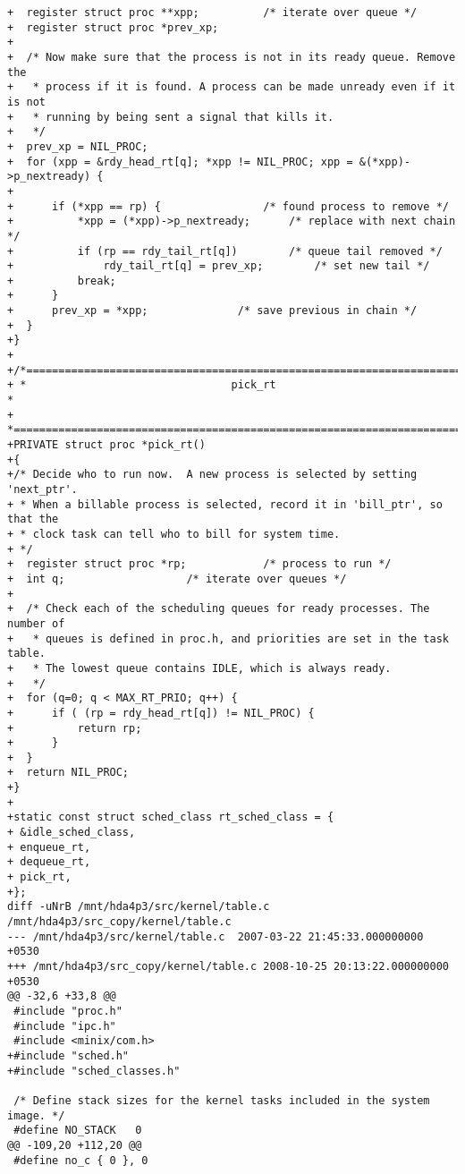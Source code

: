 \begin{verbatim}
+  register struct proc **xpp;			/* iterate over queue */
+  register struct proc *prev_xp;
+
+  /* Now make sure that the process is not in its ready queue. Remove the 
+   * process if it is found. A process can be made unready even if it is not 
+   * running by being sent a signal that kills it.
+   */
+  prev_xp = NIL_PROC;				
+  for (xpp = &rdy_head_rt[q]; *xpp != NIL_PROC; xpp = &(*xpp)->p_nextready) {
+
+      if (*xpp == rp) {				/* found process to remove */
+          *xpp = (*xpp)->p_nextready;		/* replace with next chain */
+          if (rp == rdy_tail_rt[q])		/* queue tail removed */
+              rdy_tail_rt[q] = prev_xp;		/* set new tail */
+          break;
+      }
+      prev_xp = *xpp;				/* save previous in chain */
+  }
+}
+
+/*===========================================================================*
+ *                                pick_rt                                    * 
+ *===========================================================================*/
+PRIVATE struct proc *pick_rt()
+{
+/* Decide who to run now.  A new process is selected by setting 'next_ptr'.
+ * When a billable process is selected, record it in 'bill_ptr', so that the 
+ * clock task can tell who to bill for system time.
+ */
+  register struct proc *rp;			/* process to run */
+  int q;					/* iterate over queues */
+
+  /* Check each of the scheduling queues for ready processes. The number of
+   * queues is defined in proc.h, and priorities are set in the task table.
+   * The lowest queue contains IDLE, which is always ready.
+   */
+  for (q=0; q < MAX_RT_PRIO; q++) {	
+      if ( (rp = rdy_head_rt[q]) != NIL_PROC) {
+          return rp;				 
+      }
+  }
+  return NIL_PROC;
+}
+
+static const struct sched_class rt_sched_class = {
+ &idle_sched_class,
+ enqueue_rt,
+ dequeue_rt,
+ pick_rt,
+};
diff -uNrB /mnt/hda4p3/src/kernel/table.c /mnt/hda4p3/src_copy/kernel/table.c
--- /mnt/hda4p3/src/kernel/table.c	2007-03-22 21:45:33.000000000 +0530
+++ /mnt/hda4p3/src_copy/kernel/table.c	2008-10-25 20:13:22.000000000 +0530
@@ -32,6 +33,8 @@
 #include "proc.h"
 #include "ipc.h"
 #include <minix/com.h>
+#include "sched.h"
+#include "sched_classes.h"
 
 /* Define stack sizes for the kernel tasks included in the system image. */
 #define NO_STACK	0
@@ -109,20 +112,20 @@
 #define no_c { 0 }, 0
 

\end{verbatim}

